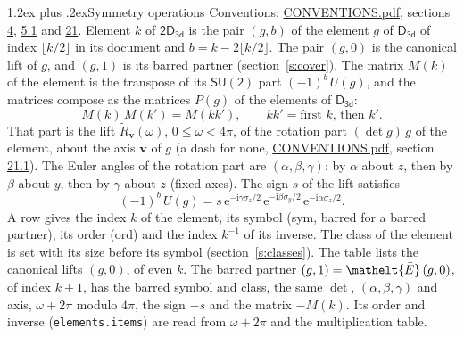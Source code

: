 \documentclass[10pt,a4paper]{article}
\makeatletter
\renewcommand\section{\@startsection{section}{1}{\z@}{-3ex plus -1ex minus -.2ex}%
  {1.2ex plus .2ex}{\normalfont\large\sffamily\bfseries\color{parttitle}}}
\numberwithin{equation}{section}
\newcommand{\eltfont}[1]{{\let\sigma\eltsigma\mathelt{#1}}}
\newcommand{\grp}[1]{\mathsf{#1}}
\newcommand{\elt}[1]{\eltfont{#1}}
\newcommand{\vv}{\mathbf{v}}
\newcommand{\iunit}{\mathrm{i}}
\newcommand{\expe}{\mathrm{e}}
\newcommand{\barred}[1]{\bar{#1}}
\newcommand{\lift}[1]{\tilde{#1}}
\newcommand{\pauli}[1]{\sigma_{#1}}
\makeatother
\begin{document}
\section{Symmetry operations}\label{s:elements}
Conventions: \href{../../CONVENTIONS.pdf}{CONVENTIONS.pdf}, sections \href{../../../rotation/CONVENTIONS.pdf\#conv.4}{4}, \href{../../../rotation/CONVENTIONS.pdf\#conv.5.1}{5.1} and \href{../../CONVENTIONS.pdf\#conv.21}{21}.
\leavevmode\label{n:index.element}\label{n:element.g}Element $k$ of $\grp{2D_{3d}}$ is the pair $(g, b)$ of the element $g$ of \href{../../../rotation/data/pdf/D3d.pdf}{$\grp{D_{3d}}$} of index $\lfloor k/2\rfloor$ in its document and $b = k - 2\lfloor k/2\rfloor$. The pair $(g, 0)$ is the canonical lift of $g$, and $(g, 1)$ is its barred partner (section~\ref{s:cover}). \label{n:matrix.element.pin}\label{n:matrix.element}The matrix $M(k)$ of the element is the transpose of its $\grp{SU(2)}$ part $(-1)^{b}\,U(g)$, and the matrices compose as the matrices $P(g)$ of the elements of $\grp{D_{3d}}$:
\begin{equation}\label{e:mprod}M(k)\,M(k') = M(kk'),\qquad kk' = \text{first } k\text{, then } k'.\end{equation}
\leavevmode\label{n:angle.omega}\label{n:vector.axis}\label{n:vector.pole}That part is the lift $\lift{R}_{\vv}(\omega)$, $0 \le \omega < 4\pi$, of the rotation part $(\det g)\,g$ of the element, about the axis $\vv$ of $g$ (a dash for none, \href{../../CONVENTIONS.pdf}{CONVENTIONS.pdf}, section \href{../../CONVENTIONS.pdf\#conv.21.1}{21.1}). \label{n:angle.euler.alpha}\label{n:angle.euler.beta}\label{n:angle.euler.gamma}\label{n:vector.coordinates}The Euler angles of the rotation part are $(\alpha,\beta,\gamma)$: by $\alpha$ about $z$, then by $\beta$ about $y$, then by $\gamma$ about $z$ (fixed axes). \label{n:local.euler.sign}The sign $s$ of the lift satisfies
\begin{equation}\label{e:euler}(-1)^{b}\,U(g) = s\,\expe^{-\iunit\gamma\pauli{z}/2}\,\expe^{-\iunit\beta\pauli{y}/2}\,\expe^{-\iunit\alpha\pauli{z}/2}.\end{equation}
\leavevmode\label{n:index.element.inverse}\label{n:head.sym}\label{n:head.ord}A row gives the index $k$ of the element, its symbol (sym, barred for a barred partner), its order (ord) and the index $k^{-1}$ of its inverse. \label{n:head.class}The class of the element is set with its size before its symbol (section~\ref{s:classes}).
The table lists the canonical lifts $(g, 0)$, of even $k$. The barred partner $(g, 1) = \elt{\barred{E}}\,(g, 0)$, of index $k + 1$, has the barred symbol and class, the same $\det$, $(\alpha,\beta,\gamma)$ and axis, $\omega + 2\pi$ modulo $4\pi$, the sign $-s$ and the matrix $-M(k)$. Its order and inverse (\texttt{elements.items}) are read from $\omega + 2\pi$ and the multiplication table.
\end{document}
